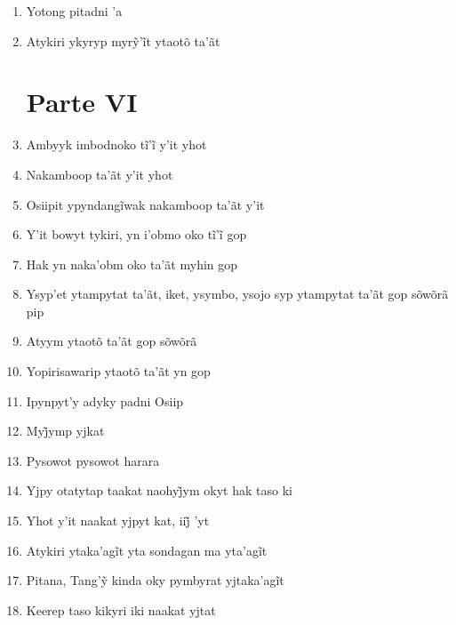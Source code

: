 \begin{enumerate}
 \item Yotong pitadni 'a

 \item Atykiri ykyryp myrỹ’ĩt ytaotõ ta’ãt

 \section{Parte VI}

 \item Ambyyk imbodnoko tĩ’ĩ y’it yhot

 \item Nakamboop ta'ãt y'it yhot

 \item Osiipit ypyndangĩwak nakamboop ta’ãt y’it

 \item Y’it bowyt tykiri, yn i’obmo oko tĩ’ĩ gop

 \item Hak yn naka'obm oko ta'ãt myhin gop

 \item Ysyp'et ytampytat ta'ãt, iket, ysymbo, ysojo syp ytampytat ta'ãt gop sõwõrã pip

 \item Atyym ytaotõ ta'ãt gop sõwõrã

 \item Yopirisawarip ytaotõ ta'ãt yn gop

 \begin{center}\end{center}

 \item Ipynpyt'y adyky padni Osiip

 \item Myj̃ymp yjkat

 \item Pysowot pysowot harara

 \item Yjpy otatytap taakat naohyj̃ym okyt hak taso ki

 \item Yhot y’it naakat yjpyt kat, iij̃ ’yt

 \begin{center}\end{center}

 \item Atykiri ytaka’agĩt yta sondagan ma yta’agĩt

 \item Pitana, Tang’ỹ kinda oky pymbyrat yjtaka’agĩt

 \item Keerep taso kikyri iki naakat yjtat
\end{enumerate}

